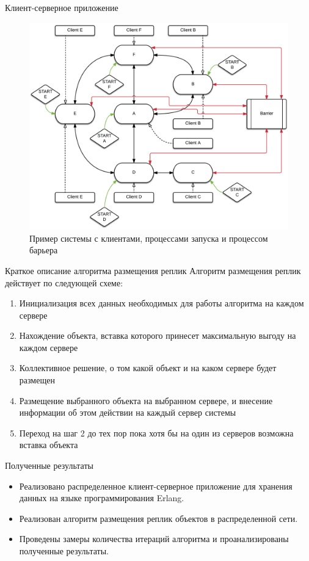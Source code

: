 \documentclass{beamer}
\begin{document}
\begin{frame}[fragile]{Клиент-серверное приложение}
	\begin{figure}
		\includegraphics[scale=0.11]{img/barrier.png}
		\caption{Пример системы с клиентами, процессами запуска и процессом барьера}
	\end{figure}
\end{frame}

\begin{frame}[fragile]{Краткое описание алгоритма размещения реплик}
	Алгоритм размещения реплик действует по следующей схеме:
	\begin{enumerate}
		\item Инициализация всех данных необходимых для работы алгоритма на каждом сервере
		\item Нахождение объекта, вставка которого принесет максимальную выгоду на каждом сервере
		\item Коллективное решение, о том какой объект и на каком сервере будет размещен
		\item Размещение выбранного объекта на выбранном сервере, и внесение информации об этом 
			  действии на каждый сервер системы
		\item Переход на шаг 2 до тех пор пока хотя бы на один из серверов возможна вставка объекта
	\end{enumerate}
\end{frame}





\begin{frame}{Полученные результаты}
	\begin{itemize}
		\item Реализовано распределенное клиент-серверное приложение для хранения данных на языке программирования Erlang. 
    	\item Реализован алгоритм размещения реплик объектов в распределенной сети. 
    	\item Проведены замеры количества итераций алгоритма и проанализированы полученные результаты.
	\end{itemize}
\end{frame}
\end{document}
